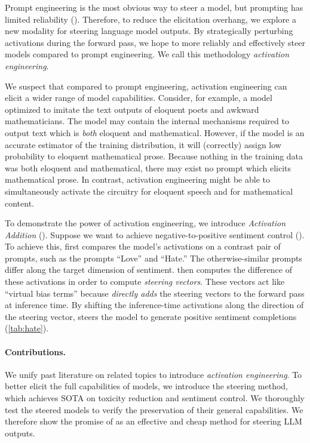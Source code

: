 \documentclass{article}
\newcommand{\shortmethod}{\text{ActAdd}}
\theoremstyle{plain}
\theoremstyle{definition}
\theoremstyle{remark}
\begin{document}
Prompt engineering is the most obvious way to steer a model, but prompting has limited reliability (\citep{NEURIPS2022_c4025018,wang2024prompt}). Therefore, to reduce the elicitation overhang, we explore a new modality for steering language model outputs. By strategically perturbing activations during the forward pass, we hope to more reliably and effectively steer models compared to prompt engineering. We call this methodology \emph{activation engineering}.


We suspect that compared to prompt engineering, activation engineering can elicit a wider range of model capabilities. Consider, for example, a model optimized to imitate the text outputs of eloquent poets and awkward mathematicians. The model may contain the internal mechanisms required to output text which is \emph{both} eloquent and mathematical. However, if the model is an accurate estimator of the training distribution, it will (correctly) assign low probability to eloquent mathematical prose. Because nothing in the training data was both eloquent and mathematical, there may exist no prompt which elicits mathematical prose. In contrast, activation engineering might be able to simultaneously activate the circuitry for eloquent speech and for mathematical content.


To demonstrate the power of activation engineering, we introduce \emph{Activation Addition} (\shortmethod). Suppose we want to achieve negative-to-positive sentiment control (\citep{li2018deleteretrievegeneratesimple,dathathri2020plug}). To achieve this, {\shortmethod} first compares the model's activations on a contrast pair of prompts, such as the prompts ``Love'' and ``Hate.'' The otherwise-similar prompts differ along the target dimension of sentiment. {\shortmethod} then computes the difference of these activations in order to compute \emph{steering vectors}. These vectors act like ``virtual bias terms'' because {\shortmethod} \emph{directly adds} the steering vectors to the forward pass at inference time. By shifting the inference-time activations along the direction of the steering vector, {\shortmethod} steers the model to generate positive sentiment completions (\cref{tab:hate}).




\paragraph{Contributions.} We unify past literature on related topics to introduce \emph{activation engineering}. To better elicit the full capabilities of models, we introduce the {\shortmethod} steering method, which achieves SOTA on toxicity reduction and sentiment control. We thoroughly test the steered models to verify the preservation of their general capabilities. We therefore show the promise of {\shortmethod} as an effective and cheap method for steering LLM outputs.
\end{document}
